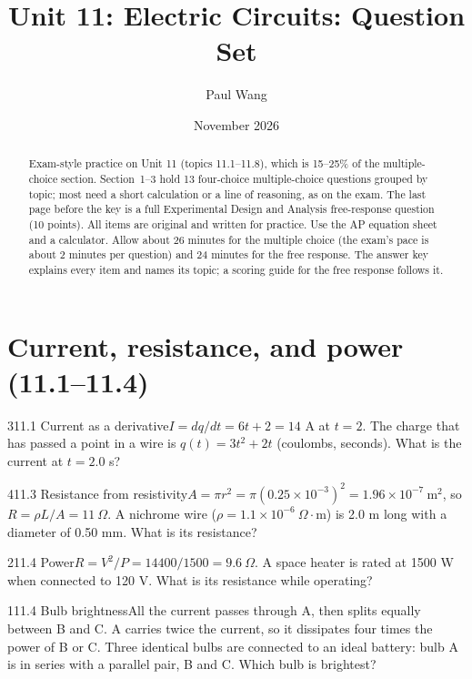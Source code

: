 \documentclass[11pt]{article}
\title{Unit 11: Electric Circuits: Question Set}
\author{Paul Wang}
\date{November 2026}
\begin{document}
\maketitle

\begin{abstract}
Exam-style practice on Unit 11 (topics 11.1--11.8), which is 15--25\% of the multiple-choice section. Section~1--3 hold 13 four-choice multiple-choice questions grouped by topic; most need a short calculation or a line of reasoning, as on the exam. The last page before the key is a full Experimental Design and Analysis free-response question (10 points). All items are original and written for practice. Use the AP equation sheet and a calculator. Allow about 26 minutes for the multiple choice (the exam's pace is about 2 minutes per question) and 24 minutes for the free response. The answer key explains every item and names its topic; a scoring guide for the free response follows it.
\end{abstract}


\section{Current, resistance, and power (11.1--11.4)}

\begin{q}{3}{11.1 Current as a derivative}{$I = dq/dt = 6t + 2 = 14$ A at $t = 2$.}
The charge that has passed a point in a wire is $q(t) = 3t^2 + 2t$ (coulombs, seconds). What is the current at $t = 2.0$ s?
\end{q}
\begin{q}{4}{11.3 Resistance from resistivity}{$A = \pi r^2 = \pi(0.25\times10^{-3})^2 = 1.96\times10^{-7}\ \mathrm{m^2}$, so $R = \rho L/A = 11\ \Omega$.}
A nichrome wire ($\rho = 1.1\times10^{-6}\ \Omega\cdot\mathrm{m}$) is 2.0 m long with a diameter of 0.50 mm. What is its resistance?
\end{q}
\begin{q}{2}{11.4 Power}{$R = V^2/P = 14400/1500 = 9.6\ \Omega$.}
A space heater is rated at 1500 W when connected to 120 V. What is its resistance while operating?
\end{q}
\begin{q}{1}{11.4 Bulb brightness}{All the current passes through A, then splits equally between B and C. A carries twice the current, so it dissipates four times the power of B or C.}
Three identical bulbs are connected to an ideal battery: bulb A is in series with a parallel pair, B and C. Which bulb is brightest?
\end{q}
\end{document}
